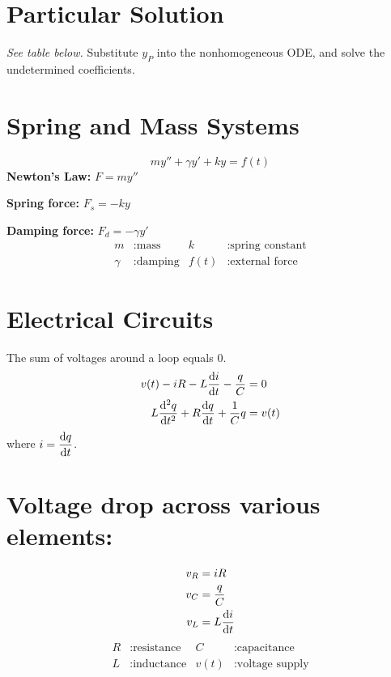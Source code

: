 \documentclass{article}
\begin{document}
\begin{multicols}{3}
    \section*{Particular Solution}
    \emph{See table below.}
    Substitute \(y_P\) into the nonhomogeneous ODE, and solve the undetermined coefficients.
    \section*{Spring and Mass Systems}
    \begin{equation*}
        m y'' + \gamma y' + k y = f(t)
    \end{equation*}
    \textbf{Newton's Law:} \(F = m y''\)

    \textbf{Spring force:} \(F_s = -k y\)

    \textbf{Damping force:} \(F_d = -\gamma y'\)
    \begin{align*}
        m      & : \text{mass}    & k    & : \text{spring constant} \\
        \gamma & : \text{damping} & f(t) & : \text{external force}
    \end{align*}
    \section*{Electrical Circuits}
    The sum of voltages around a loop equals 0.
    \begin{align*}
        v(t) - iR - L \dv{i}{t} - \frac{q}{C}      & = 0    \\
        L \dv[2]{q}{t} + R\dv{q}{t} + \frac{1}{C}q & = v(t)
    \end{align*}
    where \(\displaystyle i = \dv{q}{t}\).
    \section*{Voltage drop across various elements:}
    \begin{align*}
        v_R & = iR          \\
        v_C & = \frac{q}{C} \\
        v_L & = L \dv{i}{t}
    \end{align*}
    \begin{align*}
        R & : \text{resistance} & C    & : \text{capacitance}    \\
        L & : \text{inductance} & v(t) & : \text{voltage supply}
    \end{align*}
\end{multicols}
\end{document}
